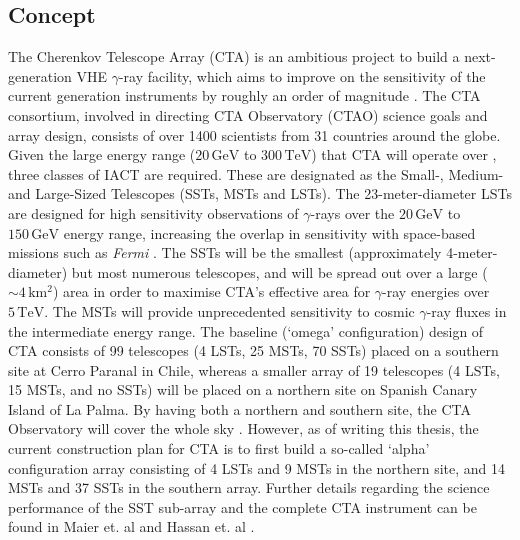 \subsection{Concept}
The Cherenkov Telescope Array (CTA) is an ambitious project to build a next-generation VHE $\gamma$-ray facility, which aims to improve on the sensitivity of the current generation instruments by roughly an order of magnitude \cite{scienceCTA}. The CTA consortium, involved in directing CTA Observatory (CTAO) science goals and array design, consists of over 1400 scientists from 31 countries around the globe. Given the large energy range ($\mathrm{20\,GeV}$ to $\mathrm{300\,TeV}$) that CTA will operate  over \cite{scienceCTA}, three classes of IACT are required. These are designated as the Small-, Medium- and Large-Sized Telescopes (SSTs, MSTs and LSTs). The 23-meter-diameter LSTs are designed for high sensitivity observations of $\gamma$-rays over the $\mathrm{20\,GeV}$ to $\mathrm{150\,GeV}$ energy range, increasing the overlap in sensitivity with space-based missions such as \textit{Fermi} \cite{Fermi}. The SSTs will be the smallest (approximately 4-meter-diameter) but most numerous telescopes, and will be spread out over a large ($\mathrm{\sim 4\,km^2}$) area in order to maximise CTA's effective area for $\gamma$-ray energies over $\mathrm{5\,TeV}$. The MSTs will provide unprecedented sensitivity to cosmic $\gamma$-ray fluxes in the intermediate energy range. The baseline (`omega' configuration) design of CTA consists of 99 telescopes (4 LSTs, 25 MSTs, 70 SSTs) placed on a southern site at Cerro Paranal in Chile, whereas a smaller array of 19 telescopes (4 LSTs, 15 MSTs, and no SSTs) will be placed on a northern site on Spanish Canary Island of La Palma. By having both a northern and southern site, the CTA Observatory will cover the whole sky \cite{scienceCTA}. However, as of writing this thesis, the current construction plan for CTA is to first build a so-called `alpha' configuration array consisting of 4 LSTs and 9 MSTs in the northern site, and 14 MSTs and 37 SSTs in the southern array. Further details regarding the science performance of the SST sub-array and the complete CTA instrument can be found in Maier et. al \cite{gernotCTA} and Hassan et. al \cite{tarekCTA}.
